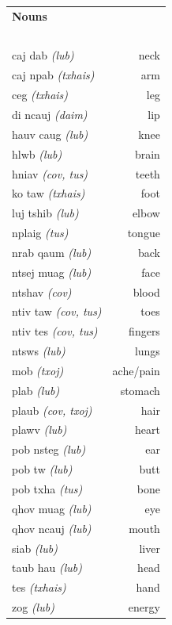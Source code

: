 \documentclass{article}
\begin{document}
\clearpage

\begin{multicols}{2}
[
\section*{}
\begin{center}\rule{\textwidth}{.4pt}\end{center}
]

\begin{tabular}{l r}
\textbf{Nouns} \\
~\\
caj dab {\em (lub)} &neck\\
caj npab {\em (txhais)} &arm\\
ceg {\em (txhais)} &leg\\
di ncauj {\em (daim)} &lip\\
hauv caug {\em (lub)} &knee\\
hlwb {\em (lub)} &brain\\
hniav {\em (cov, tus)} &teeth\\
ko taw {\em (txhais)} &foot\\
luj tshib {\em (lub)} &elbow\\
nplaig {\em (tus)} &tongue\\
nrab qaum {\em (lub)} &back\\
ntsej muag {\em (lub)} &face\\
ntshav {\em (cov)} &blood\\
ntiv taw {\em (cov, tus)} &toes\\
ntiv tes {\em (cov, tus)} &fingers\\
ntsws {\em (lub)} &lungs\\
mob {\em (txoj)} &ache/pain\\
plab {\em (lub)} &stomach\\
plaub {\em (cov, txoj)} &hair\\
plawv {\em (lub)} &heart\\
pob nsteg {\em (lub)} &ear\\
pob tw {\em (lub)} &butt\\
pob txha {\em (tus)} &bone\\
qhov muag {\em (lub)} &eye\\
qhov ncauj {\em (lub)} &mouth\\
siab {\em (lub)} &liver\\
taub hau {\em (lub)} &head\\
tes {\em (txhais)} &hand\\
zog {\em (lub)} &energy\\


\end{tabular}
\end{multicols}
\end{document}
